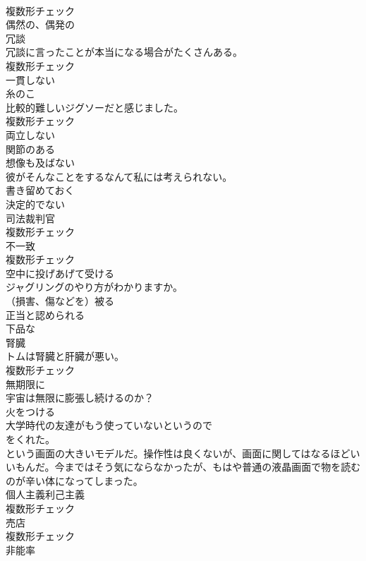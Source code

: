 \documentclass[8pt]{extreport}
\begin{document}
\begin{CJK}{UTF8}{min}
\\	複数形チェック
\\	[形容詞]	偶然の、偶発の	
\\	[名詞]	冗談	
\\	冗談に言ったことが本当になる場合がたくさんある。	
\\	複数形チェック
\\	[形容詞]	一貫しない	
\\	[名詞]	糸のこ	
\\	比較的難しいジグソーだと感じました。	
\\	複数形チェック
\\	[形容詞]	両立しない	
\\	[形容詞]	関節のある	
\\	[形容詞]	想像も及ばない	
\\	彼がそんなことをするなんて私には考えられない。	
\\	[動詞]	書き留めておく	
\\	[形容詞]	決定的でない	
\\	[名詞]	司法裁判官	
\\	複数形チェック
\\	[名詞]	不一致	
\\	複数形チェック
\\	[動詞]	空中に投げあげて受ける	
\\	ジャグリングのやり方がわかりますか。	
\\	[動詞]	（損害、傷などを）被る	
\\	[形容詞]	正当と認められる	
\\	[形容詞]	下品な	
\\	[名詞]	腎臓	
\\	トムは腎臓と肝臓が悪い。	
\\	複数形チェック
\\	[副詞]	無期限に	
\\	宇宙は無限に膨張し続けるのか？	
\\	[動詞]	火をつける	
\\	大学時代の友達がもう使っていないというので
\\	をくれた。
\\	という画面の大きいモデルだ。操作性は良くないが、画面に関してはなるほどいいもんだ。今まではそう気にならなかったが、もはや普通の液晶画面で物を読むのが辛い体になってしまった。	
\\	[名詞]	個人主義利己主義	
\\	複数形チェック
\\	[名詞]	売店	
\\	複数形チェック
\\	[名詞]	非能率	

\end{CJK}
\end{document}
